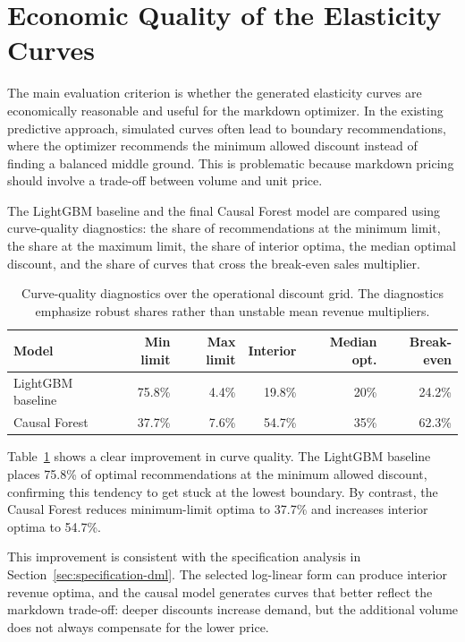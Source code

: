\section{Economic Quality of the Elasticity Curves}

The main evaluation criterion is whether the generated elasticity curves are economically reasonable and useful for the markdown optimizer. In the existing predictive approach, simulated curves often lead to boundary recommendations, where the optimizer recommends the minimum allowed discount instead of finding a balanced middle ground. This is problematic because markdown pricing should involve a trade-off between volume and unit price.

The LightGBM baseline and the final Causal Forest model are compared using curve-quality diagnostics: the share of recommendations at the minimum limit, the share at the maximum limit, the share of interior optima, the median optimal discount, and the share of curves that cross the break-even sales multiplier.

\begin{table}[h]
\centering
\small
\begin{tabular}{lrrrrr}
\toprule
\textbf{Model} & \textbf{Min limit} & \textbf{Max limit} & \textbf{Interior} & \textbf{Median opt.} & \textbf{Break-even} \\
\midrule
LightGBM baseline & 75.8\% & 4.4\% & 19.8\% & 20\% & 24.2\% \\
Causal Forest & 37.7\% & 7.6\% & 54.7\% & 35\% & 62.3\% \\
\bottomrule
\end{tabular}
\caption{Curve-quality diagnostics over the operational discount grid. The diagnostics emphasize robust shares rather than unstable mean revenue multipliers.}
\label{tab:curve-quality}
\end{table}

Table~\ref{tab:curve-quality} shows a clear improvement in curve quality. The LightGBM baseline places 75.8\% of optimal recommendations at the minimum allowed discount, confirming this tendency to get stuck at the lowest boundary. By contrast, the Causal Forest reduces minimum-limit optima to 37.7\% and increases interior optima to 54.7\%.

This improvement is consistent with the specification analysis in Section~\ref{sec:specification-dml}. The selected log-linear form can produce interior revenue optima, and the causal model generates curves that better reflect the markdown trade-off: deeper discounts increase demand, but the additional volume does not always compensate for the lower price.

